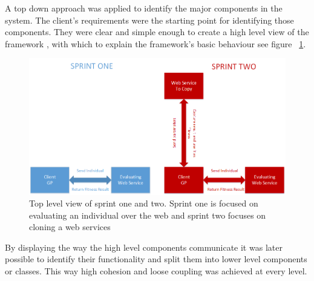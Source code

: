 A top down approach was applied to identify the major components in the system. The client's requirements were the starting point for identifying those components. They were
clear and simple enough to create a high level view of the framework , with which to explain the framework's basic behaviour see figure ~\ref{fig:sprints}. 

\begin{figure}[htp]
\centering
\includegraphics[scale=0.6]{Figures/sprints.png}
\caption{Top level view of sprint one and two. Sprint one is focused on evaluating an individual over the web and sprint two focuses on cloning a web services}
\label{fig:sprints}
\end{figure}

By displaying the way the high level components communicate it was later possible to identify their functionality and split them into lower level components or classes.
This way high cohesion and loose coupling was achieved at every level.
